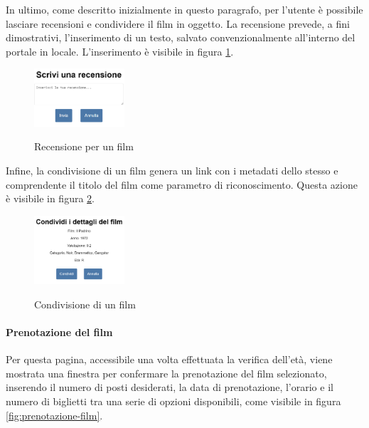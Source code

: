 \newpage 

In ultimo, come descritto inizialmente in questo paragrafo, per l'utente è possibile lasciare recensioni e condividere il film in oggetto.
La recensione prevede, a fini dimostrativi, l'inserimento di un testo, salvato convenzionalmente all'interno del portale in locale.
L'inserimento è visibile in figura \ref{fig:recensione-film}.

\begin{figure}[h]
    \centering
    \includegraphics[width=0.3\textwidth, alt={Schermata di inserimento di una recensione per un film}]{immagini/frontend/review.png}
    \caption{Recensione per un film}\label{fig:recensione-film}
\end{figure}

Infine, la condivisione di un film genera un link con i metadati dello stesso e comprendente il titolo del film come parametro di riconoscimento.
Questa azione è visibile in figura \ref{fig:condivisione-film}.

\begin{figure}[h]
    \centering
    \includegraphics[width=0.3\textwidth, alt={Schermata di condivisione di un film}]{immagini/frontend/share.png}
    \caption{Condivisione di un film}\label{fig:condivisione-film}
\end{figure}

\paragraph{Prenotazione del film}
Per questa pagina, accessibile una volta effettuata la verifica dell'età, viene mostrata una finestra per confermare la prenotazione del film selezionato, 
inserendo il numero di posti desiderati, la data di prenotazione, l'orario e il numero di biglietti tra una serie di opzioni disponibili, come visibile in figura \ref{fig:prenotazione-film}.

